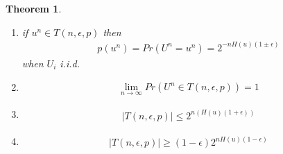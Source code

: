 \documentclass{article}
\newtheorem{theorem}{Theorem}[section]
\theoremstyle{definition} %
\begin{document}
\begin{theorem}
  \begin{enumerate}
    \item if $u^n \in T(n, \epsilon, p)$ then
    \begin{align*}
      p(u^n) = Pr(U^n = u^n) = 2^{-n H(u)(1 \pm \epsilon)}
    \end{align*}
    when $U_i$ i.i.d.
    \item
    \begin{align*}
      \lim_{n \rightarrow \infty} Pr(U^n \in T(n, \epsilon, p)) = 1
    \end{align*}
    \item
    \begin{align*}
      |T(n, \epsilon, p)| \leq 2^{n (H(u)(1 + \epsilon))}
    \end{align*}
    \item
    \begin{align*}
      |T(n, \epsilon, p)| \geq (1-\epsilon) 2^{n H(u)(1-\epsilon)}
    \end{align*}
  \end{enumerate}
\end{theorem}
\end{document}
